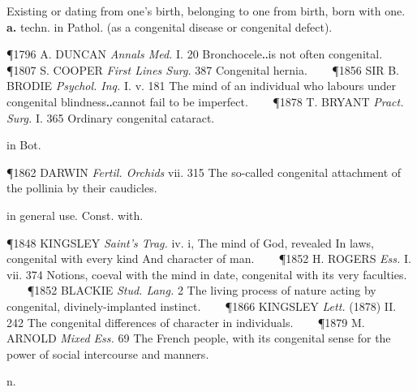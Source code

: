 \begin{description}[wide, labelwidth=!, labelindent=0pt]
\noindent {}

\vspace{-0.3cm}

\begin{myenumerate}

 Existing or dating from one's birth, belonging to one from birth, born with one. \textbf{a.} techn. in Pathol. (as a congenital disease or congenital defect).

\P 1796 A. DUNCAN  \textit{Annals Med.} I. 20 Bronchocele‥is not often congenital.    
\P 1807 S. COOPER  \textit{First Lines Surg.} 387 Congenital hernia.    
\P 1856 SIR B. BRODIE  \textit{Psychol. Inq.} I. v. 181 The mind of an individual who labours under congenital blindness‥cannot fail to be imperfect.    
\P 1878 T. BRYANT  \textit{Pract. Surg.} I. 365 Ordinary congenital cataract.

 in Bot.

\P 1862 DARWIN  \textit{Fertil. Orchids} vii. 315 The so-called congenital attachment of the pollinia by their caudicles.

 in general use. Const. with.

\P 1848 KINGSLEY  \textit{Saint's Trag.} iv. i, The mind of God, revealed In laws, congenital with every kind And character of man.    
\P 1852 H. ROGERS  \textit{Ess.} I. vii. 374 Notions, coeval with the mind in date, congenital with its very faculties.    
\P 1852 BLACKIE  \textit{Stud. Lang.} 2 The living process of nature acting by congenital, divinely-implanted instinct.    
\P 1866 KINGSLEY  \textit{Lett.} (1878) II. 242 The congenital differences of character in individuals.    
\P 1879 M. ARNOLD  \textit{Mixed Ess.} 69 The French people, with its congenital sense for the power of social intercourse and manners.
\end{myenumerate}


 n.

\noindent {}

\vspace{-0.3cm}


\end{description}

